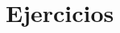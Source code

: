\documentclass[10pt,a5]{aleph-examen}
\begin{document}
\encabezado

\vspace{-5mm}

\section*{Ejercicios}
\end{document}
